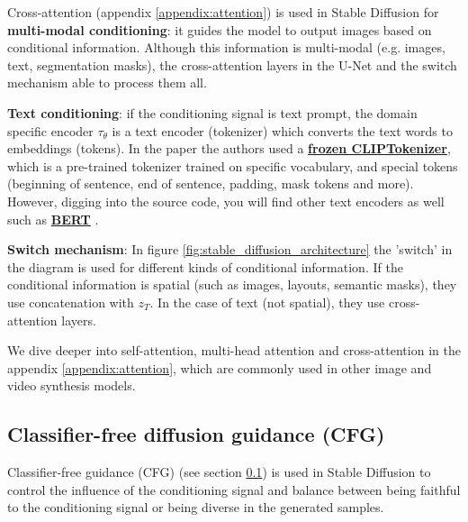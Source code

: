 Cross-attention (appendix \ref{appendix:attention}) is used in Stable Diffusion for \textbf{multi-modal conditioning}: it guides the model to output images based on conditional information. Although this information is multi-modal (e.g. images, text, segmentation masks), the cross-attention layers in the U-Net and the switch mechanism able to process them all.

\textbf{Text conditioning}: if the conditioning signal is text prompt, the domain specific encoder $\tau_\theta$ is a text encoder (tokenizer) which converts the text words to embeddings (tokens). In the paper \cite{stable_diffusion} the authors used a \href{https://github.com/CompVis/latent-diffusion/blob/a506df5756472e2ebaf9078affdde2c4f1502cd4/ldm/modules/encoders/modules.py#L138}{\textbf{frozen CLIPTokenizer}}, which is a pre-trained tokenizer trained on specific vocabulary, and special tokens (beginning of sentence, end of sentence, padding, mask tokens and more). However, digging into the source code, you will find other text encoders as well such as \href{https://github.com/CompVis/latent-diffusion/blame/a506df5756472e2ebaf9078affdde2c4f1502cd4/ldm/modules/encoders/modules.py#L53}{\textbf{BERT}} \cite{bert}.

\textbf{Switch mechanism}: In figure \ref{fig:stable_diffusion_architecture} the 'switch' in the diagram is used for different kinds of conditional information. If the conditional information is spatial (such as images, layouts, semantic masks), they use concatenation with $z_T$. In the case of text (not spatial), they use cross-attention layers. 

We dive deeper into self-attention, multi-head attention and cross-attention in the appendix \ref{appendix:attention}, which are commonly used in other image and video synthesis models.













\subsection{Classifier-free diffusion guidance (CFG)}

\label{subsec:classifier_free_diffusion_guidance}

Classifier-free guidance (CFG) (see section \ref{subsec:classifier_free_diffusion_guidance}) is used in Stable Diffusion to control the influence of the conditioning signal and balance between being faithful to the conditioning signal or being diverse in the generated samples.

